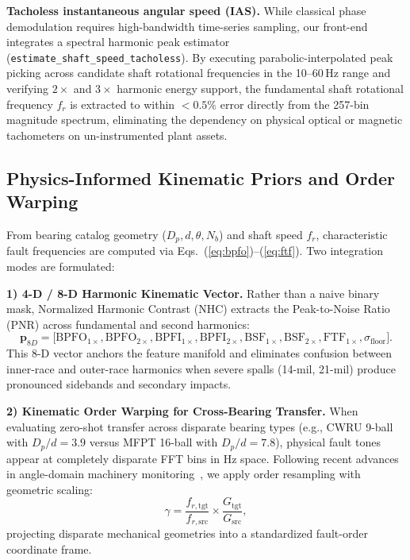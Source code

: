 \documentclass[conference]{IEEEtran}
\begin{document}
\textbf{Tacholess instantaneous angular speed (IAS).}\;
While classical phase demodulation requires high-bandwidth time-series sampling,
our front-end integrates a spectral harmonic peak estimator
(\texttt{estimate\_shaft\_speed\_tacholess}).
By executing parabolic-interpolated peak picking across candidate shaft rotational frequencies
in the 10--60\,Hz range and verifying $2\times$ and $3\times$ harmonic energy support,
the fundamental shaft rotational frequency $f_r$ is extracted to within $<0.5\%$ error
directly from the 257-bin magnitude spectrum, eliminating the dependency on physical
optical or magnetic tachometers on un-instrumented plant assets.

\subsection{Physics-Informed Kinematic Priors and Order Warping}
\label{sec:priors}

From bearing catalog geometry ($D_p, d, \theta, N_b$) and shaft speed $f_r$,
characteristic fault frequencies are computed via Eqs.~(\ref{eq:bpfo})--(\ref{eq:ftf}).
Two integration modes are formulated:

\textbf{1) 4-D / 8-D Harmonic Kinematic Vector.}\;
Rather than a naive binary mask, Normalized Harmonic Contrast (NHC) extracts
the Peak-to-Noise Ratio (PNR) across fundamental and second harmonics:
\begin{equation}
  \mathbf{p}_{8D} = \bigl[
    \mathrm{BPFO}_{1\times}, \mathrm{BPFO}_{2\times},
    \mathrm{BPFI}_{1\times}, \mathrm{BPFI}_{2\times},
    \mathrm{BSF}_{1\times}, \mathrm{BSF}_{2\times},
    \mathrm{FTF}_{1\times}, \sigma_\mathrm{floor}
  \bigr].
  \label{eq:prior_8d}
\end{equation}
This 8-D vector anchors the feature manifold and eliminates confusion between
inner-race and outer-race harmonics when severe spalls (14-mil, 21-mil) produce
pronounced sidebands and secondary impacts.

\textbf{2) Kinematic Order Warping for Cross-Bearing Transfer.}\;
When evaluating zero-shot transfer across disparate bearing types (e.g., CWRU 9-ball
with $D_p/d=3.9$ versus MFPT 16-ball with $D_p/d=7.8$), physical fault tones appear
at completely disparate FFT bins in Hz space. Following recent advances in angle-domain machinery monitoring~\cite{miao2026angledomain},
we apply order resampling with geometric scaling:
\begin{equation}
  \gamma = \frac{f_{r,\mathrm{tgt}}}{f_{r,\mathrm{src}}} \times
           \frac{G_\mathrm{tgt}}{G_\mathrm{src}},
  \label{eq:order_warp}
\end{equation}
projecting disparate mechanical geometries into a standardized fault-order coordinate frame.
\end{document}
